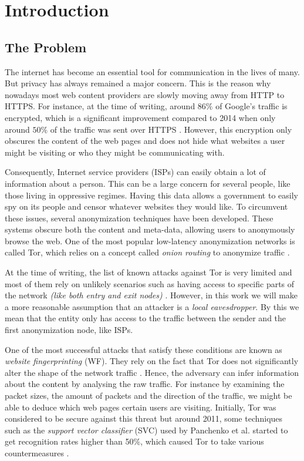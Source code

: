 \chapter{Introduction}

\section{The Problem}

The internet has become an essential tool for communication in the lives of many. But privacy has always remained a major concern.
This is the reason why nowadays most web content providers are slowly moving away from HTTP to HTTPS.
For instance, at the time of writing, around $86\%$ of Google's traffic is encrypted, which is a significant improvement compared to 2014 when only around $50\%$ of the traffic was sent over HTTPS \cite{google_transparancy}.
However, this encryption only obscures the content of the web pages and does not hide what websites a user might be visiting or who they might be communicating with.

Consequently, Internet service providers (ISPs) can easily obtain a lot of information about a person.
This can be a large concern for several people, like those living in oppressive regimes.
Having this data allows a government to easily spy on its people and censor whatever websites they would like.
To circumvent these issues, several anonymization techniques have been developed.
These systems obscure both the content and meta-data, allowing users to anonymously browse the web.
One of the most popular low-latency anonymization networks is called Tor, which relies on a concept called \textit{onion routing} to anonymize traffic \cite{tor_project}.

At the time of writing, the list of known attacks against Tor is very limited and most of them rely on unlikely scenarios such as having access to specific parts of the network \textit{(like both entry and exit nodes)} \cite{tor_project}.
However, in this work we will make a more reasonable assumption that an attacker is a \textit{local eavesdropper}.
By this we mean that the entity only has access to the traffic between the sender and the first anonymization node, like ISPs.

One of the most successful attacks that satisfy these conditions are known as \textit{website fingerprinting} (WF).
They rely on the fact that Tor does not significantly alter the shape of the network traffic \cite{kfingerprinting}.
Hence, the adversary can infer information about the content by analysing the raw traffic.
For instance by examining the packet sizes, the amount of packets and the direction of the traffic, we might be able to deduce
which web pages certain users are visiting.
Initially, Tor was considered to be secure against this threat but around 2011, some techniques such as the \textit{support vector classifier} (SVC)
used by Panchenko et al. started to get recognition rates higher than 50\%, which caused Tor to take various countermeasures \cite{panchenko1,perry2011experimental}.

